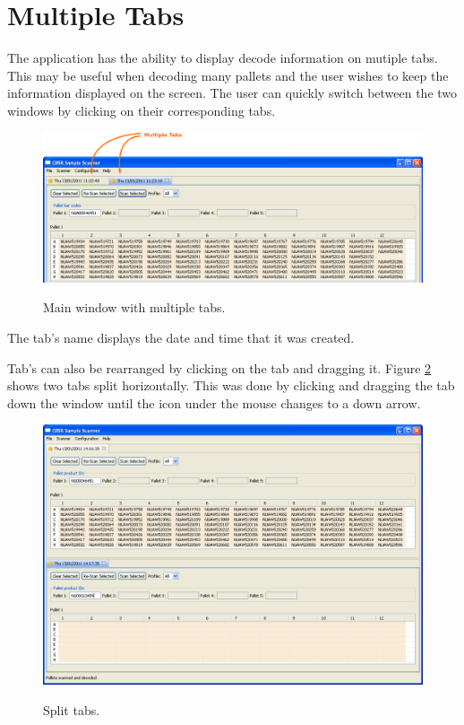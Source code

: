 \section{Multiple Tabs}
The application has the ability to display decode information on mutiple
tabs. This may be useful when decoding many pallets and the user wishes to keep
the information displayed on the screen. The user can quickly switch between
the two windows by clicking on their corresponding tabs.
\begin{figure}[H]
  \centering
  \scalebox{0.35}
	   { \includegraphics*{screenshots/scan_and_decode/multiple_tabs} }
	   \caption{Main window with multiple tabs.}
	   \label{fig:multiple_tabs}
\end{figure}
The tab's name displays the date and time that it was created.

Tab's can also be rearranged by clicking on the tab and dragging it. Figure
\ref{fig:split_tabs} shows two tabs split horizontally. This was done by
clicking and dragging the tab down the window until the icon under the mouse
changes to a down arrow.
\begin{figure}[H]
  \centering
  \scalebox{0.35}
	   { \includegraphics*{screenshots/scan_and_decode/split_tabs} }
	   \caption{Split tabs.}
	   \label{fig:split_tabs}
\end{figure}

